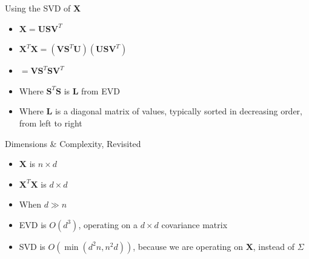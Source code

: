\documentclass[aspectratio=169]{beamer}
\begin{document}
\begin{frame}{Using the SVD of \textbf{X}}

\begin{itemize}
	\item[]
	$\textbf{X} = \textbf{USV}^T$\\
\item[]
	$\textbf{X}^T\textbf{X} = (\textbf{VS}^T\textbf{U})(\textbf{USV}^T)$
\item[]
	$= \textbf{VS}^T\textbf{SV}^T$
	\item Where $ \textbf{S}^T\textbf{S}$ is \textbf{L} from EVD
	\item Where $\textbf{L}$ is a diagonal matrix of values, typically sorted in decreasing order, from left to right
\end{itemize}
\end{frame}
\begin{frame}{Dimensions \& Complexity, Revisited}

\begin{itemize}
\item  $\textbf{X}$ is $n \times d$
\item $\textbf{X}^T\textbf{X}$ is $d \times d$
\item When $d \gg n$
\item EVD is $O(d^3)$, operating on a $d \times d$ covariance matrix
\item SVD is $O(\min(d^2n, n^2d))$, because we are operating on $\textbf{X}$, instead of  $\textbf{$\Sigma$}$
\end{itemize}
\end{frame}
\end{document}
